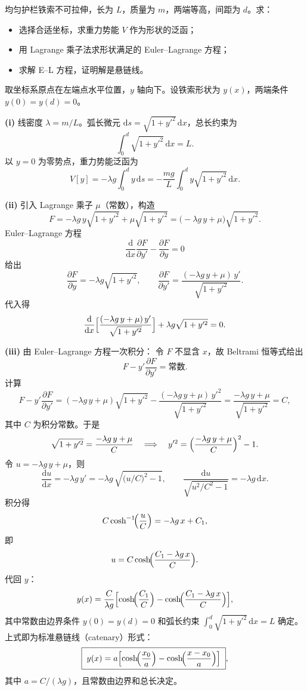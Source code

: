 \begin{question}
均匀护栏铁索不可拉伸，长为 \(L\)，质量为 \(m\)，两端等高，间距为 \(d\)。求：
\begin{itemize}
  \item[\textup{(i)}] 选择合适坐标，求重力势能 \(V\) 作为形状的泛函；
  \item[\textup{(ii)}] 用 Lagrange 乘子法求形状满足的 Euler--Lagrange 方程；
  \item[\textup{(iii)}] 求解 E--L 方程，证明解是悬链线。
\end{itemize}

\begin{solution}
取坐标系原点在左端点水平位置，\(y\) 轴向下。设铁索形状为 \(y(x)\)，两端条件 \(y(0)=y(d)=0\)。

\textbf{(i)} 线密度 \(\lambda = m/L\)。弧长微元 \(\mathrm ds = \sqrt{1+y'^2}\,\mathrm dx\)，总长约束为
\[
\int_0^d \sqrt{1+y'^2}\,\mathrm dx = L .
\]
以 \(y=0\) 为零势点，重力势能泛函为
\[
V[y] = -\lambda g \int_0^d y\,\mathrm ds
= -\frac{mg}{L}\int_0^d y\sqrt{1+y'^2}\,\mathrm dx .
\]

\textbf{(ii)} 引入 Lagrange 乘子 \(\mu\)（常数），构造
\[
F = -\lambda g\, y\sqrt{1+y'^2} + \mu\sqrt{1+y'^2}
= \bigl(-\lambda g\, y + \mu\bigr)\sqrt{1+y'^2}.
\]
Euler--Lagrange 方程
\[
\frac{\mathrm d}{\mathrm dx}\frac{\partial F}{\partial y'} - \frac{\partial F}{\partial y} = 0
\]
给出
\[
\frac{\partial F}{\partial y} = -\lambda g\sqrt{1+y'^2},
\qquad
\frac{\partial F}{\partial y'} = \frac{(-\lambda g\, y + \mu)\,y'}{\sqrt{1+y'^2}} .
\]
代入得
\[
\frac{\mathrm d}{\mathrm dx}\Bigl[\frac{(-\lambda g\, y + \mu)\,y'}{\sqrt{1+y'^2}}\Bigr]
+ \lambda g\sqrt{1+y'^2} = 0 .
\]

\textbf{(iii)} 由 Euler--Lagrange 方程一次积分：
令 \(F\) 不显含 \(x\)，故 Beltrami 恒等式给出
\[
F - y'\frac{\partial F}{\partial y'} = \text{常数}.
\]
计算
\[
F - y'\frac{\partial F}{\partial y'}
= (-\lambda g\, y + \mu)\sqrt{1+y'^2}
- \frac{(-\lambda g\, y + \mu)\,y'^2}{\sqrt{1+y'^2}}
= \frac{-\lambda g\, y + \mu}{\sqrt{1+y'^2}} = C,
\]
其中 \(C\) 为积分常数。于是
\[
\sqrt{1+y'^2} = \frac{-\lambda g\, y + \mu}{C}
\quad\Longrightarrow\quad
y'^2 = \Bigl(\frac{-\lambda g\, y + \mu}{C}\Bigr)^2 - 1 .
\]
令 \(u = -\lambda g\, y + \mu\)，则
\[
\frac{\mathrm du}{\mathrm dx} = -\lambda g\, y'
= -\lambda g\,\sqrt{\bigl(u/C\bigr)^2 - 1},
\qquad
\frac{\mathrm du}{\sqrt{u^2/C^2 - 1}} = -\lambda g\,\mathrm dx .
\]
积分得
\[
C\cosh^{-1}\!\Bigl(\frac{u}{C}\Bigr) = -\lambda g\, x + C_1,
\]
即
\[
u = C\cosh\!\Bigl(\frac{C_1 - \lambda g\, x}{C}\Bigr).
\]
代回 \(y\)：
\[
y(x) = \frac{C}{\lambda g}\Bigl[\cosh\!\Bigl(\frac{C_1}{C}\Bigr)
- \cosh\!\Bigl(\frac{C_1 - \lambda g\, x}{C}\Bigr)\Bigr],
\]
其中常数由边界条件 \(y(0)=y(d)=0\) 和弧长约束 \(\int_0^d \sqrt{1+y'^2}\,\mathrm dx = L\) 确定。上式即为标准悬链线（catenary）形式：
\[
\boxed{\;y(x) = a\Bigl[\cosh\!\Bigl(\frac{x_0}{a}\Bigr)
- \cosh\!\Bigl(\frac{x-x_0}{a}\Bigr)\Bigr]\;},
\]
其中 \(a = C/(\lambda g)\)，且常数由边界和总长决定。
\end{solution}
\end{question}

